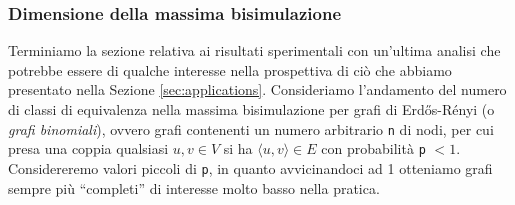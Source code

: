 \subsubsection{Dimensione della massima bisimulazione}
Terminiamo la sezione relativa ai risultati sperimentali con un'ultima analisi che potrebbe essere di qualche interesse nella prospettiva di ciò che abbiamo presentato nella Sezione \ref{sec:applications}. Consideriamo l'andamento del numero di classi di equivalenza nella massima bisimulazione per grafi di Erdős-Rényi (o \emph{grafi binomiali}), ovvero grafi contenenti un numero arbitrario \verb|n| di nodi, per cui presa una coppia qualsiasi $u,v \in V$ si ha $\langle u,v\rangle \in E$ con probabilità \verb|p| $< 1$.
Considereremo valori piccoli di \verb|p|, in quanto avvicinandoci ad 1 otteniamo grafi sempre più ``completi'' di interesse molto basso nella pratica.

